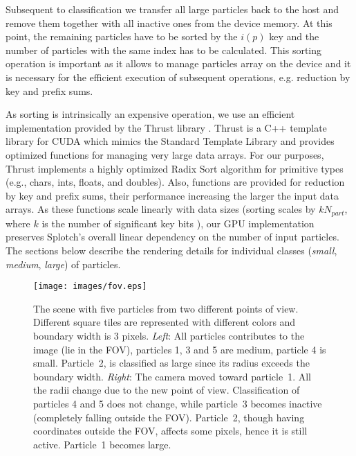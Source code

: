 \documentclass[1p]{elsarticle}
\begin{document}
Subsequent to classification we transfer all large particles back to the host and remove them together with all inactive ones from the device memory. At this point, the remaining particles have to be sorted by the $i(p)$ key and the number of particles with the same index has to be calculated.
This sorting operation is important as it allows to manage particles array on the device and it is  
necessary for the efficient execution of subsequent operations, e.g. reduction by key and prefix sums.

As sorting is intrinsically an expensive operation, we use an efficient implementation provided by the Thrust library \cite{thrusturl}. Thrust is a C++ template library for CUDA which mimics the Standard Template Library and provides optimized functions for managing very large data arrays. For our purposes, Thrust implements a highly optimized Radix Sort algorithm for primitive types (e.g., chars, ints, floats, and doubles). Also, functions are provided for reduction by key and prefix sums, their performance increasing the larger the input data arrays. As these functions scale linearly with data sizes (sorting scales by $kN_{part}$, where $k$ is the number of significant key bits \cite{RadixSort}), our GPU implementation preserves Splotch's overall linear dependency on the number of input particles. The sections below describe the rendering details for individual classes ({\it small}, {\it medium}, {\it large}) of particles.

\begin{figure}
\centering
\texttt{[image: images/fov.eps]}
\caption{The scene with five particles from two different points of view. Different square tiles are
represented with different colors and boundary width is 3 pixels. {\em Left}: All particles contributes to the image (lie in the FOV), particles 1, 3 and 5
are medium, particle 4 is small. Particle~2, is classified as large since its radius exceeds the boundary width. {\em Right}: The camera moved toward particle~1. All the radii change due to the new point
of view. Classification of particles 4 and 5 does not change, while particle~3
becomes inactive (completely falling outside the FOV). Particle~2, though
having coordinates outside the FOV, affects some pixels, hence it is still active.
Particle~1 becomes large.
}
\label{fig:fov}
\end{figure}
\end{document}

